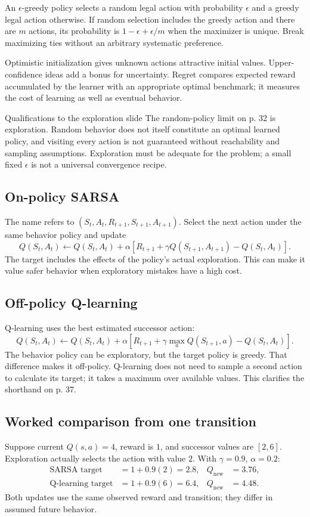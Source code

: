 \documentclass[11pt]{article}
\begin{document}
An $\epsilon$-greedy policy selects a random legal action with probability $\epsilon$ and a greedy legal action otherwise. If random selection includes the greedy action and there are $m$ actions, its probability is $1-\epsilon+\epsilon/m$ when the maximizer is unique. Break maximizing ties without an arbitrary systematic preference.

Optimistic initialization gives unknown actions attractive initial values. Upper-confidence ideas add a bonus for uncertainty. Regret compares expected reward accumulated by the learner with an appropriate optimal benchmark; it measures the cost of learning as well as eventual behavior.
\begin{careful}{Qualifications to the exploration slide}
The random-policy limit on p. 32 is exploration. Random behavior does not itself constitute an optimal learned policy, and visiting every action is not guaranteed without reachability and sampling assumptions. Exploration must be adequate for the problem; a small fixed $\epsilon$ is not a universal convergence recipe.
\end{careful}
\subsection{On-policy SARSA}
The name refers to $(S_t,A_t,R_{t+1},S_{t+1},A_{t+1})$. Select the next action under the same behavior policy and update
\[
Q(S_t,A_t)\leftarrow Q(S_t,A_t)+\alpha
[R_{t+1}+\gamma Q(S_{t+1},A_{t+1})-Q(S_t,A_t)].
\]
The target includes the effects of the policy's actual exploration. This can make it value safer behavior when exploratory mistakes have a high cost.
\subsection{Off-policy Q-learning}
Q-learning uses the best estimated successor action:
\[
Q(S_t,A_t)\leftarrow Q(S_t,A_t)+\alpha
[R_{t+1}+\gamma\max_aQ(S_{t+1},a)-Q(S_t,A_t)].
\]
The behavior policy can be exploratory, but the target policy is greedy. That difference makes it off-policy. Q-learning does not need to sample a second action to calculate its target; it takes a maximum over available values. This clarifies the shorthand on p. 37.
\subsection{Worked comparison from one transition}
Suppose current $Q(s,a)=4$, reward is $1$, and successor values are $[2,6]$. Exploration actually selects the action with value $2$. With $\gamma=0.9$, $\alpha=0.2$:
\begin{align*}
\text{SARSA target}&=1+0.9(2)=2.8,&Q_{\mathrm{new}}&=3.76,\\
\text{Q-learning target}&=1+0.9(6)=6.4,&Q_{\mathrm{new}}&=4.48.
\end{align*}
Both updates use the same observed reward and transition; they differ in assumed future behavior.
\end{document}
